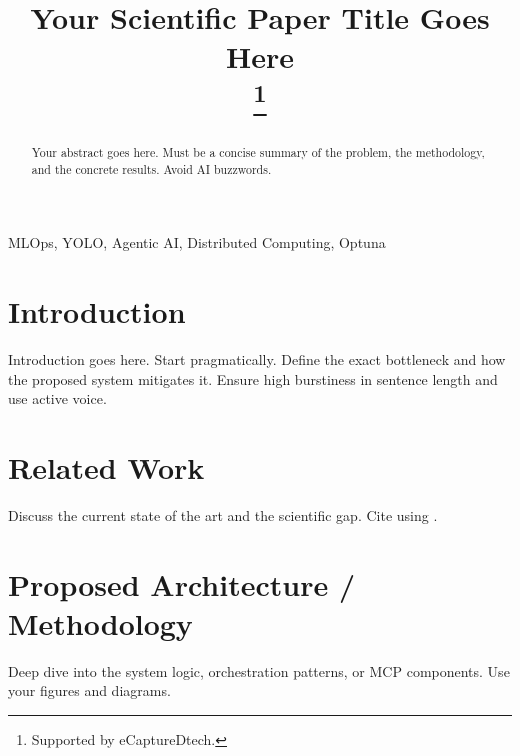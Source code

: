 \documentclass[conference]{IEEEtran}
\begin{document}
\title{Your Scientific Paper Title Goes Here\\
\thanks{Supported by eCaptureDtech.}
}

\author{
}

\maketitle

\begin{abstract}
Your abstract goes here. Must be a concise summary of the problem, the methodology, and the concrete results. Avoid AI buzzwords.
\end{abstract}

\begin{IEEEkeywords}
MLOps, YOLO, Agentic AI, Distributed Computing, Optuna
\end{IEEEkeywords}

\section{Introduction}
Introduction goes here. Start pragmatically. Define the exact bottleneck and how the proposed system mitigates it. Ensure high burstiness in sentence length and use active voice.

\section{Related Work}
Discuss the current state of the art and the scientific gap. Cite using \cite{example_reference}.

\section{Proposed Architecture / Methodology}
Deep dive into the system logic, orchestration patterns, or MCP components. Use your figures and diagrams.
\end{document}
